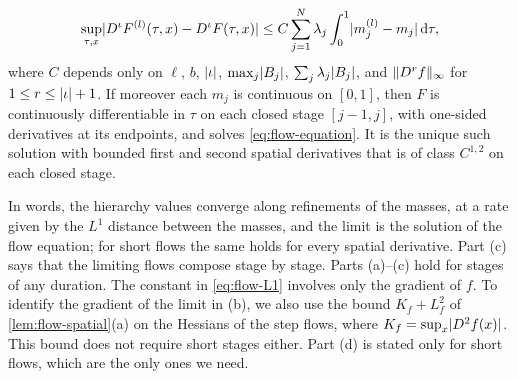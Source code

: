 \begin{lemma}
\begin{enumerate}[label=\textup{(\alph*)}]
 \begin{equation}\label{eq:flow-L1-derivatives}
  \sup_{\tau,x}\lvert D^\iota F^{(l)}(\tau,x)-D^\iota F(\tau,x)\rvert
  \le C\sum_{j=1}^N\lambda_j\int_0^1\lvert m^{(l)}_j-m_j\rvert\,\mathrm d\tau,
 \end{equation}
 where $C$ depends only on $\ell$, $b$, $\lvert \iota\rvert$, $\max_j\lvert B_j\rvert$,
 $\sum_j\lambda_j\lvert B_j\rvert$, and $\lVert D^{r}f\rVert_\infty$ for $1\le r\le\lvert \iota\rvert+1$.
 If moreover each $m_j$ is continuous on $[0,1]$, then $F$ is continuously
 differentiable in $\tau$ on each closed stage $[j-1,j]$, with one-sided
 derivatives at its endpoints, and solves \eqref{eq:flow-equation}. It is the
 unique such solution with bounded first and second spatial derivatives that is
 of class $C^{1,2}$ on each closed stage.
\end{enumerate}
\end{lemma}

In words, the hierarchy values converge along refinements of the masses, at a
rate given by the $L^1$ distance between the masses, and the limit is the
solution of the flow equation; for short flows the same holds for every spatial
derivative. Part (c) says that the limiting flows compose stage by stage. Parts
(a)--(c) hold for stages of any duration. The constant in \eqref{eq:flow-L1}
involves only the gradient of $f$. To identify the gradient of the limit in (b),
we also use the bound $K_f+L_f^2$ of \cref{lem:flow-spatial}(a) on the Hessians
of the step flows, where $K_f=\sup_x\lvert D^2f(x)\rvert$. This bound does not require
short stages either. Part (d) is stated only for short flows, which are the only
ones we need.

